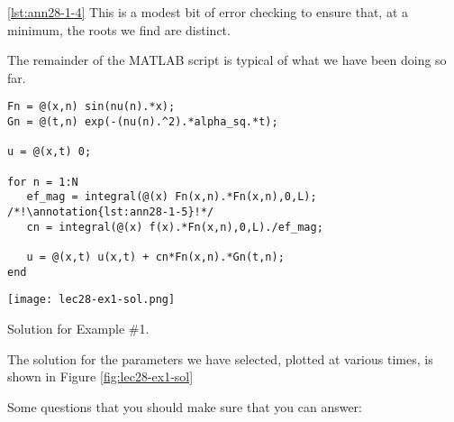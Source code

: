 \vspace{0.25cm}

\noindent \ref{lst:ann28-1-4} This is a modest bit of error checking to ensure that, at a minimum, the roots we find are distinct.

\vspace{0.25cm}

\noindent The remainder of the MATLAB script is typical of what we have been doing so far.

\begin{lstlisting}[name=lec28-ex1, style=myMatlab]
%% Construct solution
Fn = @(x,n) sin(nu(n).*x);
Gn = @(t,n) exp(-(nu(n).^2).*alpha_sq.*t); 

u = @(x,t) 0;

for n = 1:N
   ef_mag = integral(@(x) Fn(x,n).*Fn(x,n),0,L); /*!\annotation{lst:ann28-1-5}!*/
   cn = integral(@(x) f(x).*Fn(x,n),0,L)./ef_mag;
   
   u = @(x,t) u(x,t) + cn*Fn(x,n).*Gn(t,n);
end

\end{lstlisting}
\begin{marginfigure}
\texttt{[image: lec28-ex1-sol.png]}
\caption{Solution for Example \#1.}
\label{fig:lec28-ex1-sol}
\end{marginfigure}
The solution for the parameters we have selected, plotted at various times, is shown in Figure \ref{fig:lec28-ex1-sol}

Some questions that you should make sure that you can answer:%





